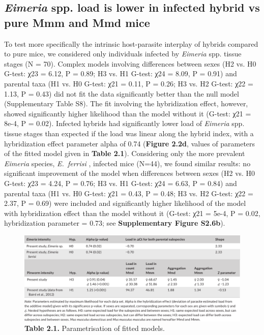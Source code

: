 \subsection{\textit{Eimeria} spp. load is lower in infected hybrid vs pure Mmm and Mmd mice} 
To test more specifically the intrinsic host-parasite interplay of hybrids compared to pure mice, we considered only individuals infected by \textit{Eimeria} spp. tissue stages (N = 70). Complex models involving differences between sexes (H2 vs. H0 G-test: χ23 = 6.12, P = 0.89; H3 vs. H1 G-test: χ24 = 8.09, P = 0.91) and parental taxa (H1 vs. H0 G-test: χ21 = 0.11, P = 0.26; H3 vs. H2 G-test: χ22 = 1.13, P = 0.43) did not fit the data significantly better than the null model (Supplementary Table S8). The fit involving the hybridization effect, however, showed significantly higher likelihood than the model without it (G-test: χ21 = 8e-4, P = 0.02). Infected hybrids had significantly lower load of \textit{Eimeria} spp. tissue stages than expected if the load was linear along the hybrid index, with a hybridization effect parameter alpha of 0.74 (\textbf{Figure 2.2d}, values of parameters of the fitted model given in \textbf{Table 2.1}). Considering only the more prevalent \textit{Eimeria} species, \textit{E.~ferrisi} , infected mice (N=44), we found similar results: no significant improvement of the model when differences between sexes (H2 vs. H0 G-test: χ23 = 4.24, P = 0.76; H3 vs. H1 G-test: χ24 = 6.63, P = 0.84) and parental taxa (H1 vs. H0 G-test: χ21 = 0.43, P = 0.48; H3 vs. H2 G-test: χ22 = 2.37, P = 0.69) were included and significantly higher likelihood of the model with hybridization effect than the model without it (G-test: χ21 = 5e-4, P = 0.02, hybridization parameter = 0.73; see \textbf{Supplementary Figure S2.6b}). 

\begin{figure}[H]
	\centering
	\includegraphics[width=\linewidth,height=\textheight,keepaspectratio]{images/2article1/Table1.pdf}
	\captionsetup{labelformat=empty}
	\caption{\textbf{Table 2.1.} Parametrisation of fitted models.}
\end{figure}
\addtocounter{figure}{-1}

